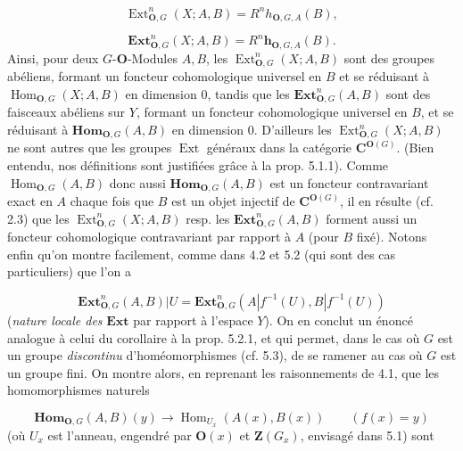 \[
\tag{5.6.6}
\operatorname{Ext}_{{\mathbf O},G}^n(X;A,B)=R^n h_{{\mathbf O},G,A}(B),
\]

\[
\tag{5.6.7}
\mathbf{Ext}_{{\mathbf O},G}^n(X;A,B)=R^n\mathbf h_{{\mathbf O},G,A}(B).
\]
Ainsi, pour deux $G$-${\mathbf O}$-Modules $A,B$, les
$\operatorname{Ext}_{{\mathbf O},G}^n(X;A,B)$ sont des groupes abéliens, formant un
foncteur cohomologique universel en $B$ et se réduisant à
$\operatorname{Hom}_{{\mathbf O},G}(X;A,B)$ en dimension 0, tandis que les
$\mathbf{Ext}_{{\mathbf O},G}^n(A,B)$ sont des faisceaux abéliens sur $Y$, formant un
foncteur cohomologique universel en $B$, et se réduisant à
$\mathbf{Hom}_{{\mathbf O},G}(A,B)$ en dimension 0. D'ailleurs les
$\operatorname{Ext}_{{\mathbf O},G}^n(X;A,B)$ ne sont autres que les groupes $\operatorname{Ext}$
généraux dans la catégorie ${\mathbf C}^{{\mathbf O}(G)}$. (Bien entendu, nos définitions sont
justifiées grâce à la prop. 5.1.1). Comme $\operatorname{Hom}_{{\mathbf O},G}(A,B)$ donc
aussi $\mathbf{Hom}_{{\mathbf O},G}(A,B)$ est un foncteur contravariant exact en $A$
chaque fois que $B$ est un objet injectif de ${\mathbf C}^{{\mathbf O}(G)}$, il en résulte
(cf. 2.3) que les $\operatorname{Ext}_{{\mathbf O},G}^n(X;A,B)$ resp. les
$\mathbf{Ext}_{{\mathbf O},G}^n(A,B)$ forment aussi un foncteur cohomologique
contravariant par rapport à $A$ (pour $B$ fixé). Notons enfin qu'on montre
facilement, comme dans 4.2 et 5.2 (qui sont des cas particuliers) que l'on a

\[
\tag{5.6.8}
\mathbf{Ext}_{{\mathbf O},G}^n(A,B)|U
=\mathbf{Ext}_{{\mathbf O},G}^n(A|f^{-1}(U),B|f^{-1}(U))
\]
 (\textit{nature locale des} $\mathbf{Ext}$ par rapport à
l'espace $Y$). On en conclut un énoncé analogue à celui du corollaire à la
prop. 5.2.1, et qui permet, dans le cas où $G$ est un groupe \textit{discontinu}
d'homéomorphismes (cf. 5.3), de se ramener au cas où $G$ est un groupe fini. On
montre alors, en reprenant les raisonnements de 4.1, que les homomorphismes
naturels

\[
\tag{5.6.9}
\mathbf{Hom}_{{\mathbf O},G}(A,B)(y)
\to \operatorname{Hom}_{U_x}(A(x),B(x))
\qquad (f(x)=y)
\]
 (où $U_x$ est l'anneau, engendré par ${\mathbf O}(x)$ et ${\mathbf Z}(G_x)$, envisagé
dans 5.1) sont

